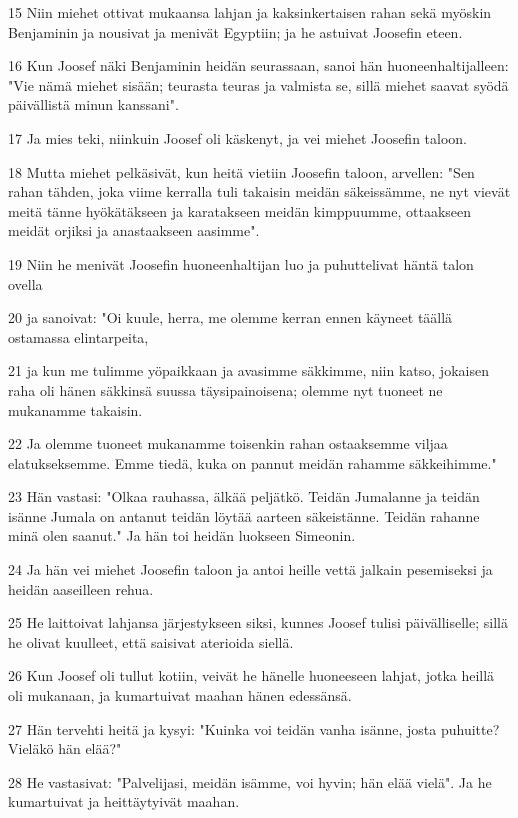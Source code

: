 \par 15 Niin miehet ottivat mukaansa lahjan ja kaksinkertaisen rahan sekä myöskin Benjaminin ja nousivat ja menivät Egyptiin; ja he astuivat Joosefin eteen.
\par 16 Kun Joosef näki Benjaminin heidän seurassaan, sanoi hän huoneenhaltijalleen: "Vie nämä miehet sisään; teurasta teuras ja valmista se, sillä miehet saavat syödä päivällistä minun kanssani".
\par 17 Ja mies teki, niinkuin Joosef oli käskenyt, ja vei miehet Joosefin taloon.
\par 18 Mutta miehet pelkäsivät, kun heitä vietiin Joosefin taloon, arvellen: "Sen rahan tähden, joka viime kerralla tuli takaisin meidän säkeissämme, ne nyt vievät meitä tänne hyökätäkseen ja karatakseen meidän kimppuumme, ottaakseen meidät orjiksi ja anastaakseen aasimme".
\par 19 Niin he menivät Joosefin huoneenhaltijan luo ja puhuttelivat häntä talon ovella
\par 20 ja sanoivat: "Oi kuule, herra, me olemme kerran ennen käyneet täällä ostamassa elintarpeita,
\par 21 ja kun me tulimme yöpaikkaan ja avasimme säkkimme, niin katso, jokaisen raha oli hänen säkkinsä suussa täysipainoisena; olemme nyt tuoneet ne mukanamme takaisin.
\par 22 Ja olemme tuoneet mukanamme toisenkin rahan ostaaksemme viljaa elatukseksemme. Emme tiedä, kuka on pannut meidän rahamme säkkeihimme."
\par 23 Hän vastasi: "Olkaa rauhassa, älkää peljätkö. Teidän Jumalanne ja teidän isänne Jumala on antanut teidän löytää aarteen säkeistänne. Teidän rahanne minä olen saanut." Ja hän toi heidän luokseen Simeonin.
\par 24 Ja hän vei miehet Joosefin taloon ja antoi heille vettä jalkain pesemiseksi ja heidän aaseilleen rehua.
\par 25 He laittoivat lahjansa järjestykseen siksi, kunnes Joosef tulisi päivälliselle; sillä he olivat kuulleet, että saisivat aterioida siellä.
\par 26 Kun Joosef oli tullut kotiin, veivät he hänelle huoneeseen lahjat, jotka heillä oli mukanaan, ja kumartuivat maahan hänen edessänsä.
\par 27 Hän tervehti heitä ja kysyi: "Kuinka voi teidän vanha isänne, josta puhuitte? Vieläkö hän elää?"
\par 28 He vastasivat: "Palvelijasi, meidän isämme, voi hyvin; hän elää vielä". Ja he kumartuivat ja heittäytyivät maahan.
